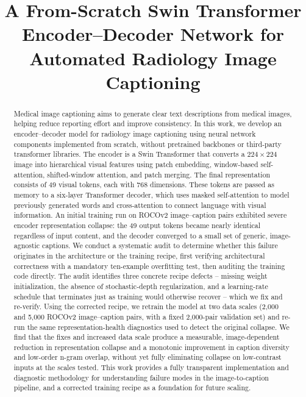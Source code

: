 \documentclass[conference]{IEEEtran}
\begin{document}
\title{A From-Scratch Swin Transformer Encoder--Decoder Network for Automated Radiology Image Captioning}

\author{
}

\maketitle

\begin{abstract}
Medical image captioning aims to generate clear text descriptions from medical images, helping reduce reporting effort and improve consistency. In this work, we develop an encoder--decoder model for radiology image captioning using neural network components implemented from scratch, without pretrained backbones or third-party transformer libraries. The encoder is a Swin Transformer that converts a $224\times224$ image into hierarchical visual features using patch embedding, window-based self-attention, shifted-window attention, and patch merging. The final representation consists of 49 visual tokens, each with 768 dimensions. These tokens are passed as memory to a six-layer Transformer decoder, which uses masked self-attention to model previously generated words and cross-attention to connect language with visual information. An initial training run on ROCOv2 image--caption pairs exhibited severe encoder representation collapse: the 49 output tokens became nearly identical regardless of input content, and the decoder converged to a small set of generic, image-agnostic captions. We conduct a systematic audit to determine whether this failure originates in the architecture or the training recipe, first verifying architectural correctness with a mandatory ten-example overfitting test, then auditing the training code directly. The audit identifies three concrete recipe defects -- missing weight initialization, the absence of stochastic-depth regularization, and a learning-rate schedule that terminates just as training would otherwise recover -- which we fix and re-verify. Using the corrected recipe, we retrain the model at two data scales (2,000 and 5,000 ROCOv2 image--caption pairs, with a fixed 2,000-pair validation set) and re-run the same representation-health diagnostics used to detect the original collapse. We find that the fixes and increased data scale produce a measurable, image-dependent reduction in representation collapse and a monotonic improvement in caption diversity and low-order n-gram overlap, without yet fully eliminating collapse on low-contrast inputs at the scales tested. This work provides a fully transparent implementation and diagnostic methodology for understanding failure modes in the image-to-caption pipeline, and a corrected training recipe as a foundation for future scaling.
\end{abstract}
\end{document}
